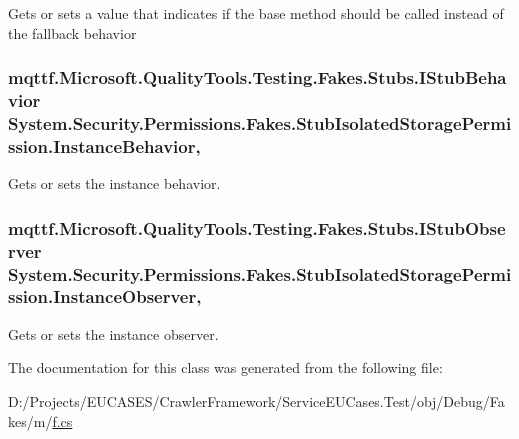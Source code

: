 Gets or sets a value that indicates if the base method should be called instead of the fallback behavior

\hypertarget{class_system_1_1_security_1_1_permissions_1_1_fakes_1_1_stub_isolated_storage_permission_a160585ca8b86671d8b89ff22af0afd45}{
\subsubsection[{Instance\-Behavior}]{\setlength{\rightskip}{0pt plus 5cm}mqttf.\-Microsoft.\-Quality\-Tools.\-Testing.\-Fakes.\-Stubs.\-I\-Stub\-Behavior System.\-Security.\-Permissions.\-Fakes.\-Stub\-Isolated\-Storage\-Permission.\-Instance\-Behavior\hspace{0.3cm}{\ttfamily [get]}, {\ttfamily [set]}}}\label{class_system_1_1_security_1_1_permissions_1_1_fakes_1_1_stub_isolated_storage_permission_a160585ca8b86671d8b89ff22af0afd45}


Gets or sets the instance behavior.

\hypertarget{class_system_1_1_security_1_1_permissions_1_1_fakes_1_1_stub_isolated_storage_permission_a4f0ca789260abe49d5f01d4f8f6db975}{
\subsubsection[{Instance\-Observer}]{\setlength{\rightskip}{0pt plus 5cm}mqttf.\-Microsoft.\-Quality\-Tools.\-Testing.\-Fakes.\-Stubs.\-I\-Stub\-Observer System.\-Security.\-Permissions.\-Fakes.\-Stub\-Isolated\-Storage\-Permission.\-Instance\-Observer\hspace{0.3cm}{\ttfamily [get]}, {\ttfamily [set]}}}\label{class_system_1_1_security_1_1_permissions_1_1_fakes_1_1_stub_isolated_storage_permission_a4f0ca789260abe49d5f01d4f8f6db975}


Gets or sets the instance observer.



The documentation for this class was generated from the following file\-:\begin{DoxyCompactItemize}
\item 
D\-:/\-Projects/\-E\-U\-C\-A\-S\-E\-S/\-Crawler\-Framework/\-Service\-E\-U\-Cases.\-Test/obj/\-Debug/\-Fakes/m/\hyperlink{m_2f_8cs}{f.\-cs}\end{DoxyCompactItemize}
